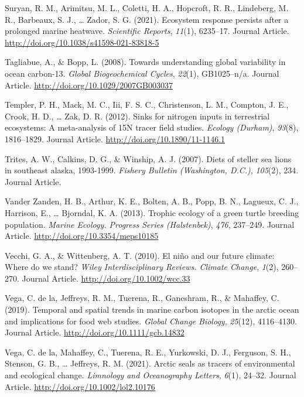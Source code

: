 \documentclass [11pt, proquest] {uwthesis}[2015/03/03]
\begin{document}
\hypertarget{ref-Suryan2021}{}
Suryan, R. M., Arimitsu, M. L., Coletti, H. A., Hopcroft, R. R.,
Lindeberg, M. R., Barbeaux, S. J., \ldots{} Zador, S. G. (2021).
Ecosystem response persists after a prolonged marine heatwave.
\emph{Scientific Reports}, \emph{11}(1), 6235--17. Journal Article.
\url{http://doi.org/10.1038/s41598-021-83818-5}

\hypertarget{ref-Tagliabue2008}{}
Tagliabue, A., \& Bopp, L. (2008). Towards understanding global
variability in ocean carbon-13. \emph{Global Biogeochemical Cycles},
\emph{22}(1), GB1025--n/a. Journal Article.
\url{http://doi.org/10.1029/2007GB003037}

\hypertarget{ref-Templer2012}{}
Templer, P. H., Mack, M. C., Iii, F. S. C., Christenson, L. M., Compton,
J. E., Crook, H. D., \ldots{} Zak, D. R. (2012). Sinks for nitrogen
inputs in terrestrial ecosystems: A meta-analysis of 15N tracer field
studies. \emph{Ecology (Durham)}, \emph{93}(8), 1816--1829. Journal
Article. \url{http://doi.org/10.1890/11-1146.1}

\hypertarget{ref-Trites2007}{}
Trites, A. W., Calkins, D. G., \& Winship, A. J. (2007). Diets of
steller sea lions in southeast alaska, 1993-1999. \emph{Fishery Bulletin
(Washington, D.C.)}, \emph{105}(2), 234. Journal Article.

\hypertarget{ref-VanderZanden2013}{}
Vander Zanden, H. B., Arthur, K. E., Bolten, A. B., Popp, B. N.,
Lagueux, C. J., Harrison, E., \ldots{} Bjorndal, K. A. (2013). Trophic
ecology of a green turtle breeding population. \emph{Marine Ecology.
Progress Series (Halstenbek)}, \emph{476}, 237--249. Journal Article.
\url{http://doi.org/10.3354/meps10185}

\hypertarget{ref-Vecchi2010}{}
Vecchi, G. A., \& Wittenberg, A. T. (2010). El niño and our future
climate: Where do we stand? \emph{Wiley Interdisciplinary Reviews.
Climate Change}, \emph{1}(2), 260--270. Journal Article.
\url{http://doi.org/10.1002/wcc.33}

\hypertarget{ref-delaVega2019}{}
Vega, C. de la, Jeffreys, R. M., Tuerena, R., Ganeshram, R., \&
Mahaffey, C. (2019). Temporal and spatial trends in marine carbon
isotopes in the arctic ocean and implications for food web studies.
\emph{Global Change Biology}, \emph{25}(12), 4116--4130. Journal
Article. \url{http://doi.org/10.1111/gcb.14832}

\hypertarget{ref-delaVega2021}{}
Vega, C. de la, Mahaffey, C., Tuerena, R. E., Yurkowski, D. J.,
Ferguson, S. H., Stenson, G. B., \ldots{} Jeffreys, R. M. (2021). Arctic
seals as tracers of environmental and ecological change. \emph{Limnology
and Oceanography Letters}, \emph{6}(1), 24--32. Journal Article.
\url{http://doi.org/10.1002/lol2.10176}
\end{document}
